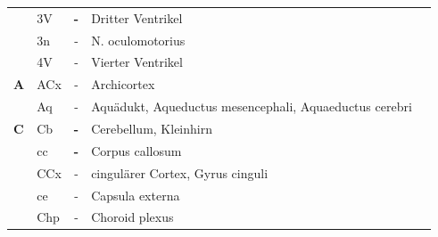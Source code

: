 \documentclass[12pt,a4paper,pdftex]{article}
\begin{document}

\begin{table}[H]
\begin{tabular}{llcll}
           & 3V  & \textbf{-} & Dritter Ventrikel                                                       & \multicolumn{1}{c}{\textbf{}} \\
\textbf{}  & 3n  & -          & N. oculomotorius                                                        & \multicolumn{1}{c}{}          \\
\textbf{}  & 4V  & -          & Vierter Ventrikel                                                       & \multicolumn{1}{c}{}          \\
\textbf{A} & ACx & -          & Archicortex                                                             & \multicolumn{1}{c}{}          \\
\textbf{}  & Aq  & -          & Aquädukt, Aqueductus mesencephali, Aquaeductus cerebri                  & \multicolumn{1}{c}{}          \\
\textbf{C} & Cb  & \textbf{-} & Cerebellum, Kleinhirn                                                   & \multicolumn{1}{c}{\textbf{}} \\
           & cc  & \textbf{-} & Corpus callosum                                                         & \multicolumn{1}{c}{\textbf{}} \\
\textbf{}  & CCx & -          & cingulärer Cortex, Gyrus cinguli             & \multicolumn{1}{c}{}          \\
\textbf{}  & ce  & -          & Capsula externa                                                         & \multicolumn{1}{c}{}          \\
\textbf{}  & Chp & -          & Choroid plexus                                                          & \multicolumn{1}{c}{}          \\

\end{tabular}
\end{table}
\end{document}
